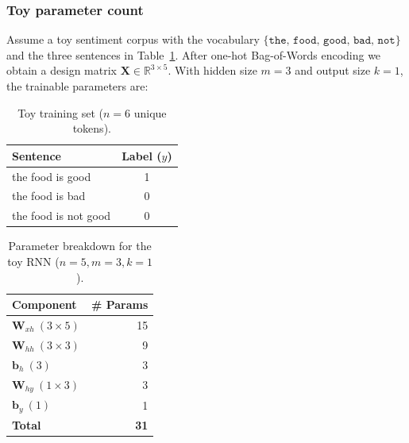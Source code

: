 \documentclass[conference]{IEEEtran}
\begin{document}
\subsubsection{Toy parameter count}

Assume a toy sentiment corpus with the vocabulary
$\{\texttt{the, food, good, bad, not}\}$ and the three sentences in
Table~\ref{tab:toydata_english}.  After one-hot Bag-of-Words encoding we obtain
a design matrix $\mathbf{X}\in\mathbb{R}^{3\times 5}$.  With hidden size
$m=3$ and output size $k=1$, the trainable parameters are:

\begin{table}[!t]
    \caption{Toy training set ($n=6$ unique tokens).}
    \label{tab:toydata_english}
    \centering
    \begin{tabular}{lc}
        \toprule
        \textbf{Sentence} & \textbf{Label ($y$)} \\
        \midrule
        the food is good     & 1 \\
        the food is bad      & 0 \\
        the food is not good & 0 \\
        \bottomrule
    \end{tabular}
\end{table}

\begin{table}[!t]
    \caption{Parameter breakdown for the toy RNN ($n=5, m=3, k=1$).}
    \label{tab:rnnparams_simple}
    \centering
    \begin{tabular}{@{} l r @{}}
        \toprule
        \textbf{Component} & \textbf{\# Params} \\
        \midrule
        $\mathbf{W}_{xh}\ (3 \times 5)$ & 15 \\
        $\mathbf{W}_{hh}\ (3 \times 3)$ &  9 \\
        $\mathbf{b}_h\ (3)$             &  3 \\
        $\mathbf{W}_{hy}\ (1 \times 3)$ &  3 \\
        $\mathbf{b}_y\ (1)$             &  1 \\
        \textbf{Total}                 & \textbf{31} \\
        \bottomrule
    \end{tabular}
\end{table}
\end{document}

